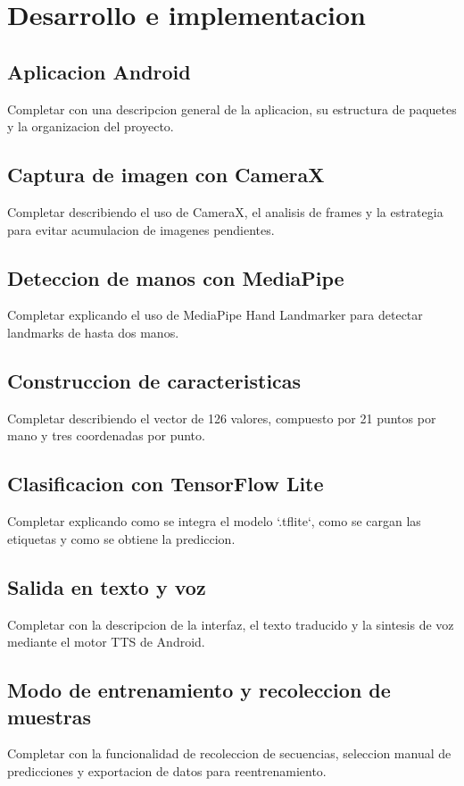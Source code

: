 \chapter{Desarrollo e implementacion}

\section{Aplicacion Android}

Completar con una descripcion general de la aplicacion, su estructura de paquetes y la organizacion del proyecto.

\section{Captura de imagen con CameraX}

Completar describiendo el uso de CameraX, el analisis de frames y la estrategia para evitar acumulacion de imagenes pendientes.

\section{Deteccion de manos con MediaPipe}

Completar explicando el uso de MediaPipe Hand Landmarker para detectar landmarks de hasta dos manos.

\section{Construccion de caracteristicas}

Completar describiendo el vector de 126 valores, compuesto por 21 puntos por mano y tres coordenadas por punto.

\section{Clasificacion con TensorFlow Lite}

Completar explicando como se integra el modelo `.tflite`, como se cargan las etiquetas y como se obtiene la prediccion.

\section{Salida en texto y voz}

Completar con la descripcion de la interfaz, el texto traducido y la sintesis de voz mediante el motor TTS de Android.

\section{Modo de entrenamiento y recoleccion de muestras}

Completar con la funcionalidad de recoleccion de secuencias, seleccion manual de predicciones y exportacion de datos para reentrenamiento.
